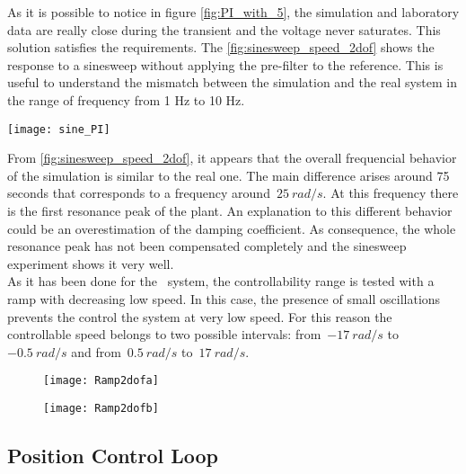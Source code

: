 As it is possible to notice in figure \ref{fig:PI_with_5}, the simulation and laboratory data are really close during the transient and the voltage never saturates. This solution satisfies the requirements. The \cref{fig:sinesweep_speed_2dof} shows the response to a sinesweep without applying the pre-filter to the reference.  This is useful to understand the mismatch between the simulation and the real system in the range of frequency from 1 Hz to 10 Hz.

\begin{figure*}[h]
	\centering
	\texttt{[image: sine\_PI]}
	\caption{Sineweep experiment from $1\ Hz$ to $10\ Hz$ in $100\ s$}
	\label{fig:sinesweep_speed_2dof}
\end{figure*}

From \cref{fig:sinesweep_speed_2dof}, it appears that the overall frequencial behavior of the simulation is similar to the real one. The main difference arises around 75 seconds that corresponds to a frequency around~$25\ rad/s$. At this frequency there is the first resonance peak of the plant. An explanation to this different behavior could be an overestimation of the damping coefficient. As consequence, the whole resonance peak has not been compensated completely and the sinesweep experiment shows it very well. \\

As it has been done for the \onedof\ system, the controllability range is tested with a ramp with decreasing low speed. In this case, the presence of small oscillations prevents the control the system at very low speed. For this reason the controllable speed belongs to two possible intervals: from~$-17\ rad/s$ to~$-0.5\ rad/s$ and from~$0.5\ rad/s$ to~$17\ rad/s$.
\begin{figure*}[h]
	\centering
	\begin{subfigure}{0.45\columnwidth}
		\texttt{[image: Ramp2dofa]}
	\end{subfigure}
	\begin{subfigure}{0.45\columnwidth}
		\texttt{[image: Ramp2dofb]}
	\end{subfigure}

	\caption{Ramp experiment from $17\ rad/s$ to $0\ rad/s$ in $100\ s$}
	\label{fig:Ramp2dof}
\end{figure*}

\newpage
\subsection{Position Control Loop}

